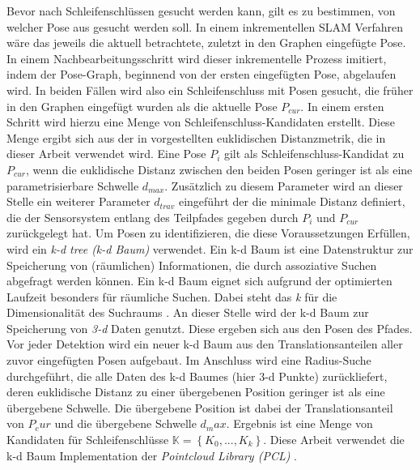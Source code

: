 Bevor nach Schleifenschlüssen gesucht werden kann, gilt es zu bestimmen, von welcher Pose aus gesucht werden soll. In einem inkrementellen SLAM Verfahren wäre das jeweils die aktuell betrachtete, zuletzt in den Graphen eingefügte Pose. In einem Nachbearbeitungsschritt wird dieser inkrementelle Prozess imitiert, indem der Pose-Graph, beginnend von der ersten eingefügten Pose, abgelaufen wird. In beiden Fällen wird also ein Schleifenschluss mit Posen gesucht, die früher in den Graphen eingefügt wurden als die aktuelle Pose $P_{cur}$. In einem ersten Schritt wird hierzu eine Menge von Schleifenschluss-Kandidaten erstellt. Diese Menge ergibt sich aus der in \cite{borrmann2008globally, shan2020lio} vorgestellten euklidischen Distanzmetrik, die in dieser Arbeit verwendet wird. Eine Pose $P_i$ gilt als Schleifenschluss-Kandidat zu $P_{cur}$, wenn die euklidische Distanz zwischen den beiden Posen geringer ist als eine parametrisierbare Schwelle $d_{max}$. Zusätzlich zu diesem Parameter wird an dieser Stelle ein weiterer Parameter $d_{trav}$ eingeführt der die minimale Distanz definiert, die der Sensorsystem entlang des Teilpfades gegeben durch $P_i$ und $P_{cur}$ zurückgelegt hat. Um Posen zu identifizieren, die diese Voraussetzungen Erfüllen, wird ein \emph{k-d tree (k-d Baum)} \cite{bentley1975multidimensional} verwendet. Ein k-d Baum ist eine Datenstruktur zur Speicherung von (räumlichen) Informationen, die durch assoziative Suchen abgefragt werden können. Ein k-d Baum eignet sich aufgrund der optimierten Laufzeit besonders für räumliche Suchen. Dabei steht das \emph{k} für die Dimensionalität des Suchraums \cite{bentley1975multidimensional}. An dieser Stelle wird der k-d Baum zur Speicherung von \emph{3-d} Daten genutzt. Diese ergeben sich aus den Posen des Pfades. Vor jeder Detektion wird ein neuer k-d Baum aus den Translationsanteilen aller zuvor eingefügten Posen aufgebaut. Im Anschluss wird eine Radius-Suche durchgeführt, die alle Daten des k-d Baumes (hier 3-d Punkte) zurückliefert, deren euklidische Distanz zu einer übergebenen Position geringer ist als eine übergebene Schwelle. Die übergebene Position ist dabei der Translationsanteil von $P_cur$ und die übergebene Schwelle $d_max$. Ergebnis ist eine Menge von Kandidaten für Schleifenschlüsse $\mathbb{K} = \left\lbrace K_0, ..., K_k \right\rbrace$. Diese Arbeit verwendet die k-d Baum Implementation der \emph{Pointcloud Library (PCL)} \cite{rusu20113d}.

